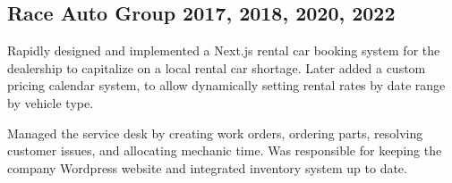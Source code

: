 \documentclass[letter,10pt]{article}
\begin{document}
\subsection{{Race Auto Group \hfill 2017, 2018, 2020, 2022}}
\begin{zitemize}
\item Rapidly designed and implemented a Next.js rental car booking system for the dealership to capitalize on a local rental car shortage. Later added a custom pricing calendar system, to allow dynamically setting rental rates by date range by vehicle type.
\item Managed the service desk by creating work orders, ordering parts, resolving customer issues, and allocating mechanic time. Was responsible for keeping the company Wordpress website and integrated inventory system up to date.
\end{zitemize}
\end{document}
